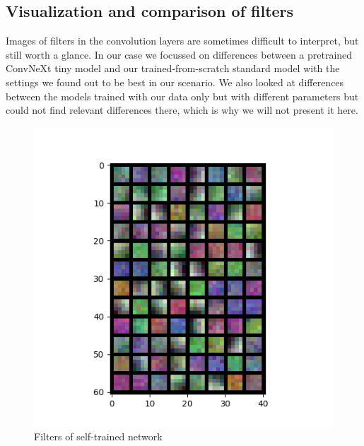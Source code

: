 \documentclass{article}
\begin{document}
\subsection{Visualization and comparison of filters}\label{subsec:filter-images}
Images of filters in the convolution layers are sometimes difficult to interpret, but still worth a glance.
In our case we focussed on differences between a pretrained ConvNeXt tiny model and our trained-from-scratch standard model with the settings we found out to be best in our scenario.
We also looked at differences between the models trained with our data only but with different parameters but could not find relevant differences there, which is why we will not present it here.
\begin{figure}[h]
    \centering
    \begin{minipage}[b]{0.49\textwidth}
        \includegraphics[width=\textwidth]{images/filters_layer0_from_scratch}
        \caption{Filters of self-trained network}
    \end{minipage}
    \hfill
    \begin{minipage}[b]{0.49\textwidth}

\end{minipage}
\end{figure}
\end{document}
